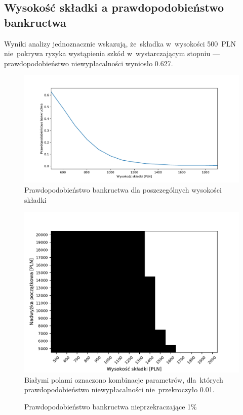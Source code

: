 \documentclass[12pt, a4paper, oneside]{mwart} %
\begin{document}
\subsection{Wysokość składki a prawdopodobieństwo bankructwa}
Wyniki analizy jednoznacznie wskazują, że~składka w~wysokości 500~PLN nie~pokrywa ryzyka wystąpienia szkód w~wystarczającym stopniu --- prawdopodobieństwo niewypłacalności wyniosło 0.627.

\begin{figure}
\centering
\includegraphics[width = \textwidth]{n=1000/p_bankructwa.pdf}
\caption{Prawdopodobieństwo bankructwa dla poszczególnych wysokości składki}
\label{p_bankructwa_n1000}
\end{figure}

\begin{figure}
\centering
\includegraphics[width = \textwidth]{wykresy/p_heatmapa_bankructwo_mniej_niz_0,01.pdf}
\footnotesize Białymi polami oznaczono kombinacje parametrów, dla~których prawdopodobieństwo niewypłacalności nie~przekroczyło 0.01.
\caption{Prawdopodobieństwo bankructwa nieprzekraczające 1\%}
\label{p_heatmapa_bankructwo_mniej_niz_0,01}
\end{figure}
\end{document}
